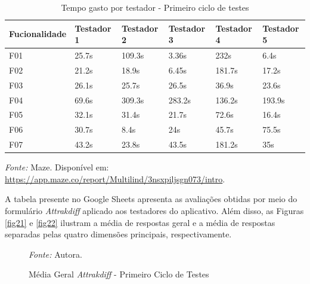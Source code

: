 \begin{table}[h!]
	\centering
	\caption{Tempo gasto por testador - Primeiro ciclo de testes}
	\label{tab04}
	\begin{tabular}{l|l|l|l|l|l}
	\hline
	Fucionalidade & Testador 1 & Testador 2 & Testador 3 & Testador 4 & Testador 5 \\ 	\hline
	F01                   & 25.7s     & 109.3s     & 3.36s      & 232s       & 6.4s      \\
	F02                   & 21.2s        & 18.9s      & 6.45s      & 181.7s    & 17.2s     \\
	F03                   & 26.1s        & 25.7s      & 26.5s      & 36.9s     & 23.6s     \\
	F04                   & 69.6s        & 309.3s     & 283.2s     & 136.2s     & 193.9s     \\
	F05                   & 32.1s      & 31.4s      & 21.7s     & 72.6s     & 16.4s     \\
	F06                   & 30.7s     & 8.4s      & 24s     & 45.7s     & 75.5s     \\
	F07                   & 43.2s     & 23.8s      & 43.5s     & 181.2s    & 35s      \\ 	\hline
	\end{tabular}
	\begin{tablenotes}[flushleft]
		\centering
		\item \textit{Fonte:} Maze. Disponível em: \url{https://app.maze.co/report/Multilind/3nsxpiljsgn073/intro}.
	  \end{tablenotes}
\end{table}


A tabela presente no Google Sheets apresenta as avaliações obtidas por meio do formulário \textit{Attrakdiff} aplicado aos testadores do aplicativo. Além disso, as Figuras \ref{fig21} e \ref{fig22} ilustram a média de respostas geral e a média 
de respostas separadas pelas quatro dimensões principais, respectivamente.

\begin{figure}[h!]
	\centering
	\caption{Média Geral \textit{Attrakdiff} - Primeiro Ciclo de Testes}
	\begin{tablenotes}[flushleft]
		\centering
		\item \textit{Fonte:} Autora.
	\end{tablenotes}
	\label{fig20}
\end{figure}

